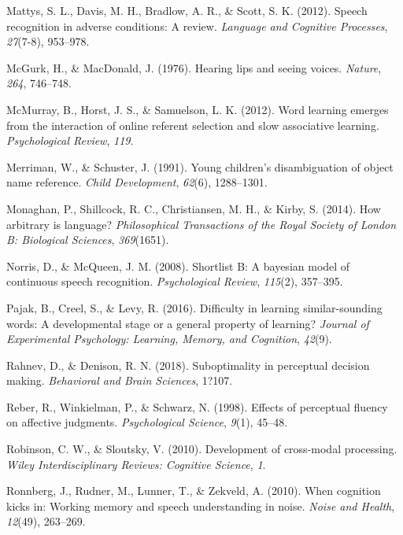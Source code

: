 \documentclass[english,floatsintext,man]{apa6}
\theoremstyle{definition}
\theoremstyle{definition}
\theoremstyle{definition}
\theoremstyle{remark}
\begin{document}
\hypertarget{ref-mattys12}{}
Mattys, S. L., Davis, M. H., Bradlow, A. R., \& Scott, S. K. (2012).
Speech recognition in adverse conditions: A review. \emph{Language and
Cognitive Processes}, \emph{27}(7-8), 953--978.

\hypertarget{ref-mcgurk1976}{}
McGurk, H., \& MacDonald, J. (1976). Hearing lips and seeing voices.
\emph{Nature}, \emph{264}, 746--748.

\hypertarget{ref-mcmurray2012}{}
McMurray, B., Horst, J. S., \& Samuelson, L. K. (2012). Word learning
emerges from the interaction of online referent selection and slow
associative learning. \emph{Psychological Review}, \emph{119}.

\hypertarget{ref-Merriman91}{}
Merriman, W., \& Schuster, J. (1991). Young children's disambiguation of
object name reference. \emph{Child Development}, \emph{62}(6),
1288--1301.

\hypertarget{ref-Monaghan2014}{}
Monaghan, P., Shillcock, R. C., Christiansen, M. H., \& Kirby, S.
(2014). How arbitrary is language? \emph{Philosophical Transactions of
the Royal Society of London B: Biological Sciences}, \emph{369}(1651).

\hypertarget{ref-Norris08}{}
Norris, D., \& McQueen, J. M. (2008). Shortlist B: A bayesian model of
continuous speech recognition. \emph{Psychological Review},
\emph{115}(2), 357--395.

\hypertarget{ref-pajak2016}{}
Pajak, B., Creel, S., \& Levy, R. (2016). Difficulty in learning
similar-sounding words: A developmental stage or a general property of
learning? \emph{Journal of Experimental Psychology: Learning, Memory,
and Cognition}, \emph{42}(9).

\hypertarget{ref-rahnev2018}{}
Rahnev, D., \& Denison, R. N. (2018). Suboptimality in perceptual
decision making. \emph{Behavioral and Brain Sciences}, 1?107.

\hypertarget{ref-reber98}{}
Reber, R., Winkielman, P., \& Schwarz, N. (1998). Effects of perceptual
fluency on affective judgments. \emph{Psychological Science},
\emph{9}(1), 45--48.

\hypertarget{ref-robinson2010}{}
Robinson, C. W., \& Sloutsky, V. (2010). Development of cross-modal
processing. \emph{Wiley Interdisciplinary Reviews: Cognitive Science},
\emph{1}.

\hypertarget{ref-Ronnberg10}{}
Ronnberg, J., Rudner, M., Lunner, T., \& Zekveld, A. (2010). When
cognition kicks in: Working memory and speech understanding in noise.
\emph{Noise and Health}, \emph{12}(49), 263--269.
\end{document}

